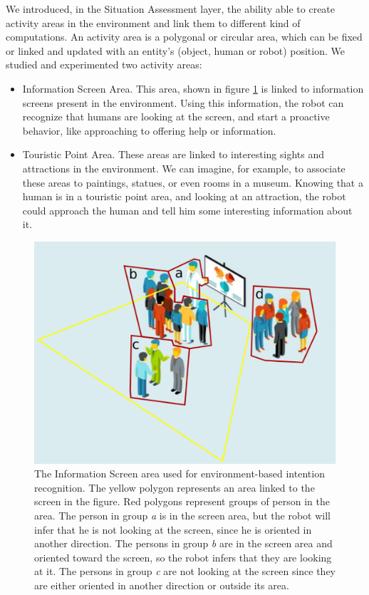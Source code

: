 We introduced, in the Situation Assessment layer, the ability able to create activity areas in the environment and link them to different kind of computations. An activity area is a polygonal or circular area, which can be fixed or linked and updated with an entity's (object, human or robot) position. We studied and experimented two activity areas:

\begin{itemize}
\item Information Screen Area. This area, shown in figure \ref{fig:case_study-spencer-screen_area} is linked to information screens present in the environment. Using this information, the robot can recognize that humans are looking at the screen, and  start a proactive behavior, like approaching to offering help or information.
\item Touristic Point Area. These areas are linked to interesting sights and attractions in the environment. We can imagine, for example, to associate these areas to paintings, statues, or even rooms in a museum. Knowing that a human is in a touristic point area, and looking at an attraction, the robot could approach the human and tell him some interesting information about it.
\end{itemize}

\begin{figure}[ht!]
	\centering
	\includegraphics[scale=0.45]{img/case_study/spencer/environment_intention.pdf}
	\caption[Environment-Based Situation Assessment]{The Information Screen area used for environment-based intention recognition. The yellow polygon represents an area linked to the screen in the figure. Red polygons represent groups of person in the area. The person in group \textit{a} is in the screen area, but the robot will infer that he is not looking at the screen, since he is oriented in another direction. The persons in group \textit{b} are in the screen area and oriented toward the screen, so the robot infers that they are looking at it. The persons in group \textit{c} are not looking at the screen since they are either oriented in another direction or outside its area.}
	\label{fig:case_study-spencer-screen_area}
\end{figure}

